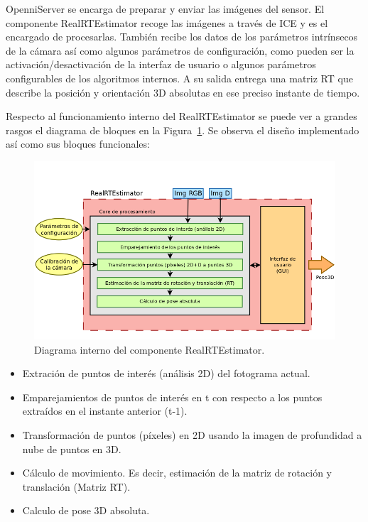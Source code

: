 OpenniServer se encarga de preparar y enviar las imágenes del sensor. El componente RealRTEstimator recoge las imágenes a través de ICE y es el encargado de procesarlas. También recibe los datos de los parámetros intrínsecos de la cámara así como algunos parámetros de configuración, como pueden ser la activación/desactivación de la interfaz de usuario o algunos parámetros configurables de los algoritmos internos. A su salida entrega una matriz RT que describe la posición y orientación 3D absolutas en ese preciso instante de tiempo. 

Respecto al funcionamiento interno del RealRTEstimator se puede ver a grandes rasgos el diagrama de bloques en la Figura~\ref{fig:diagram2}. Se observa el diseño implementado así como sus bloques funcionales:

\begin{figure}[!ht]
\centering
\includegraphics[scale=0.36]{Figures/diagram2.png}
\decoRule
\caption[Diagrama interno del componente RealRTEstimator]{Diagrama interno del componente RealRTEstimator.}
\label{fig:diagram2}
\end{figure}

\begin{itemize}
\item Extración de puntos de interés (análisis 2D) del fotograma actual.

\item Emparejamientos de puntos de interés en t con respecto a los puntos extraídos en el instante anterior (t-1).

\item Transformación de puntos (píxeles) en 2D usando la imagen de profundidad a nube de puntos en 3D.

\item Cálculo de movimiento. Es decir, estimación de la matriz de rotación y translación (Matriz RT).

\item Calculo de pose 3D absoluta.

\end{itemize}

